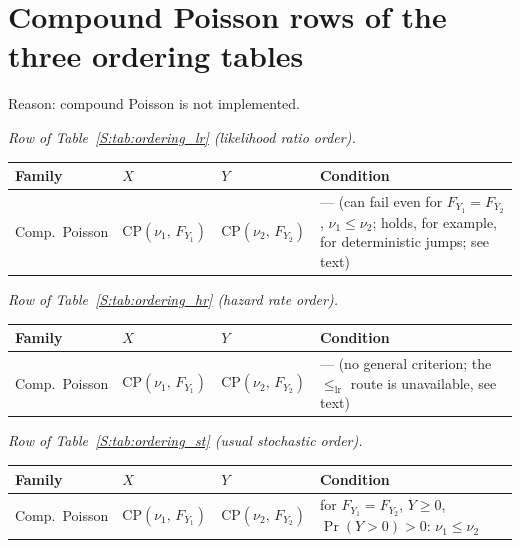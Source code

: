 \documentclass[11pt,a4paper]{article}
\theoremstyle{plain}
\theoremstyle{definition}
\theoremstyle{remark}
\begin{document}
\section{Compound Poisson rows of the three ordering tables}

Reason: compound Poisson is not implemented.

\noindent\textit{Row of Table~\ref{S:tab:ordering_lr} (likelihood ratio order).}

\begin{center}
\small
\begin{tabularx}{\linewidth}{@{}>{\hsize=0.604\hsize\raggedright\arraybackslash}X>{\hsize=1.094\hsize\raggedright\arraybackslash}X>{\hsize=1.151\hsize\raggedright\arraybackslash}X>{\hsize=1.151\hsize\raggedright\arraybackslash}X@{}}
\toprule
\rowcolor{headgrey}
\textbf{Family} & $X$ & $Y$ & \textbf{Condition} \\
\midrule
Comp.\ Poisson
  & $\mathrm{CP}(\nu_1,\,F_{Y_1})$
  & $\mathrm{CP}(\nu_2,\,F_{Y_2})$
  & --- (can fail even for $F_{Y_1}{=}F_{Y_2}$, $\nu_1 \le \nu_2$; holds, for example, for deterministic jumps; see text) \\
\bottomrule
\end{tabularx}
\end{center}

\noindent\textit{Row of Table~\ref{S:tab:ordering_hr} (hazard rate order).}

\begin{center}
\small
\begin{tabularx}{\linewidth}{@{}>{\hsize=0.604\hsize\raggedright\arraybackslash}X>{\hsize=1.094\hsize\raggedright\arraybackslash}X>{\hsize=1.151\hsize\raggedright\arraybackslash}X>{\hsize=1.151\hsize\raggedright\arraybackslash}X@{}}
\toprule
\rowcolor{headgrey}
\textbf{Family} & $X$ & $Y$ & \textbf{Condition} \\
\midrule
Comp.\ Poisson
  & $\mathrm{CP}(\nu_1,\,F_{Y_1})$
  & $\mathrm{CP}(\nu_2,\,F_{Y_2})$
  & --- (no general criterion; the $\le_{\mathrm{lr}}$ route is unavailable, see text) \\
\bottomrule
\end{tabularx}
\end{center}

\noindent\textit{Row of Table~\ref{S:tab:ordering_st} (usual stochastic order).}

\begin{center}
\small
\begin{tabularx}{\linewidth}{@{}>{\hsize=0.604\hsize\raggedright\arraybackslash}X>{\hsize=1.094\hsize\raggedright\arraybackslash}X>{\hsize=1.151\hsize\raggedright\arraybackslash}X>{\hsize=1.151\hsize\raggedright\arraybackslash}X@{}}
\toprule
\rowcolor{headgrey}
\textbf{Family} & $X$ & $Y$ & \textbf{Condition} \\
\midrule
Comp.\ Poisson
  & $\mathrm{CP}(\nu_1,\,F_{Y_1})$
  & $\mathrm{CP}(\nu_2,\,F_{Y_2})$
  & for $F_{Y_1} = F_{Y_2}$, $Y \ge 0$, $\Pr(Y > 0) > 0$: $\nu_1 \le \nu_2$ \\
\bottomrule
\end{tabularx}
\end{center}
\end{document}
